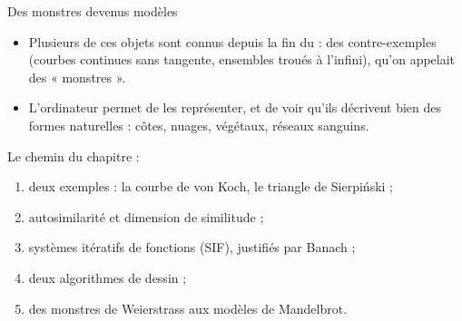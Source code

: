 \begin{frame}{Des monstres devenus modèles}
  \small
  \begin{itemize}
    \item Plusieurs de ces objets sont connus depuis la fin du
       : des contre-exemples (courbes continues sans
      tangente, ensembles troués à l'infini), qu'on appelait des
      « monstres ».
    \item L'ordinateur permet de les représenter, et de voir qu'ils
      décrivent bien des formes naturelles : côtes, nuages, végétaux,
      réseaux sanguins.
  \end{itemize}
  \vspace{6pt}
  Le chemin du chapitre :
  \begin{enumerate}
    \item deux exemples : la courbe de von Koch, le triangle de Sierpiński ;
    \item autosimilarité et dimension de similitude ;
    \item systèmes itératifs de fonctions (SIF), justifiés par Banach ;
    \item deux algorithmes de dessin ;
    \item des monstres de Weierstrass aux modèles de Mandelbrot.
  \end{enumerate}
\end{frame}

